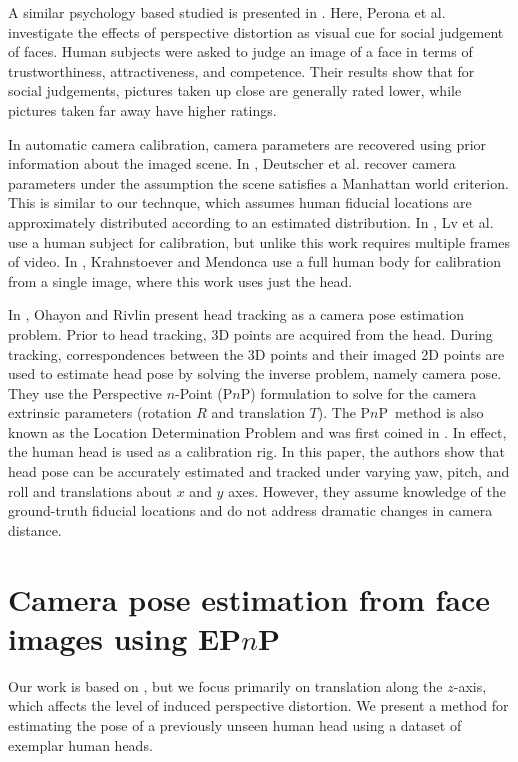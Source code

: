 \documentclass[runningheads]{llncs}
\newcommand {\PnP} {P$n$P}
\newcommand {\EPnP} {EP$n$P}
\begin{document}
A similar psychology based studied is presented in \cite{perona2007new,bryan2012perspective}. 
Here, Perona et al. investigate the effects of perspective distortion as visual cue for social judgement of faces.  
Human subjects were asked to judge an image of a face in terms of trustworthiness, attractiveness, and competence.  
Their results show that for social judgements, pictures taken up close are generally rated lower, while pictures taken far away have higher ratings.

In automatic camera calibration, camera parameters are recovered using prior information about the imaged scene.
In \cite{deutscher2002automatic}, Deutscher et al. recover camera parameters under the assumption the scene satisfies a Manhattan world criterion.
This is similar to our technque, which assumes human fiducial locations are approximately distributed according to an estimated distribution. 
In \cite{lv2006camera}, Lv et al. use a human subject for calibration, but unlike this work requires multiple frames of video.
In \cite{krahnstoever2005bayesian}, Krahnstoever and Mendonca use a full human body for calibration from a single image, where this work uses just the head.

In \cite{ohayon2006robust}, Ohayon and Rivlin present head tracking as a camera pose estimation problem.  
Prior to head tracking, 3D points are acquired from the head.  
During tracking, correspondences between the 3D points and their imaged 2D points are used to estimate head pose by solving the inverse problem, namely camera pose. 
They use the Perspective $n$-Point (\PnP) formulation to solve for the camera extrinsic parameters (rotation $R$ and translation $T$).  
The \PnP~method is also known as the Location Determination Problem and was first coined in \cite{ransac}.  
In effect, the human head is used as a calibration rig.  
In this paper, the authors show that head pose can be accurately estimated and tracked under varying yaw, pitch, and roll and translations about $x$ and $y$ axes. 
However, they assume knowledge of the ground-truth fiducial locations and do not address dramatic changes in camera distance.

\section{Camera pose estimation from face images using \EPnP}

Our work is based on \cite{ohayon2006robust}, but we focus primarily on translation along the $z$-axis, which affects the level of induced perspective distortion.  
We present a method for estimating the pose of a previously unseen human head using a dataset of exemplar human heads. 
\end{document}

